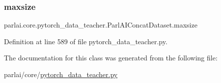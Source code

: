 \subsubsection{\texorpdfstring{maxsize}{maxsize}}
{\footnotesize\ttfamily parlai.\+core.\+pytorch\+\_\+data\+\_\+teacher.\+Parl\+A\+I\+Concat\+Dataset.\+maxsize\hspace{0.3cm}{\ttfamily [static]}}



Definition at line 589 of file pytorch\+\_\+data\+\_\+teacher.\+py.



The documentation for this class was generated from the following file\+:\begin{DoxyCompactItemize}
\item 
parlai/core/\hyperlink{pytorch__data__teacher_8py}{pytorch\+\_\+data\+\_\+teacher.\+py}\end{DoxyCompactItemize}
